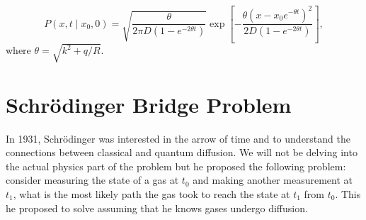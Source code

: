 \documentclass[12pt]{article}
\def\alpha{R}
\begin{document}
\begin{singlespace}
\begin{tcolorbox}[breakable, enforce breakable,colback=gray!20!white,colframe=white,arc=8pt,outer arc=8pt]
    \[
    P(x, t \mid x_0, 0) = \sqrt{\frac{\theta}{2\pi D \left(1 - e^{-2\theta t}\right)}} \exp \left[ -\frac{\theta \left(x - x_0 e^{-\theta t}\right)^2}{2D \left(1 - e^{-2\theta t}\right)} \right],
    \]
    where $\theta = \sqrt{k^2 + {q}/{\alpha}}$.
\end{tcolorbox}

\section{Schr\"odinger Bridge Problem}
In 1931, Schr\"odinger was interested in the arrow of time and to understand the connections between classical and quantum diffusion. We will not be delving into the actual physics part of the problem but he proposed the following problem: consider measuring the state of a gas at $t_0$ and making another measurement at $t_1$, what is the most likely path the gas took to reach the state at $t_1$ from $t_0$. This he proposed to solve assuming that he knows gases undergo diffusion.


\end{singlespace}
\end{document}
